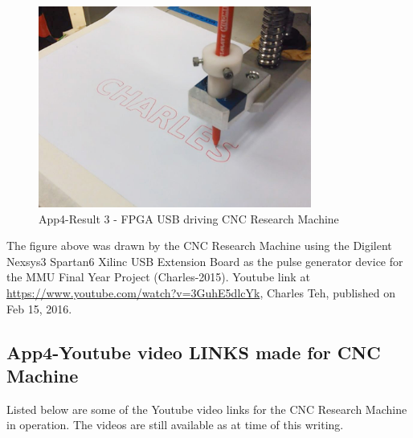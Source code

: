 \begin{figure}[htbp]
	\begin{center}
		\includegraphics[width=0.80\textwidth]{./07-images/img-Ch4App/cnc-drawing-result-CHARLES.jpg}
		\caption{App4-Result 3 - FPGA USB driving CNC Research Machine}
		\label{fig:App4-Charles - CNC Research Machine FPGA drawing CHARLES}
	\end{center}
\end{figure}
The figure above was drawn by the CNC Research Machine using the Digilent Nexsys3 Spartan6 Xilinc USB Extension Board as the pulse generator device for the MMU Final Year Project (Charles-2015). Youtube link at \url{https://www.youtube.com/watch?v=3GuhE5dlcYk}, Charles Teh, published on Feb 15, 2016. 

\subsection{App4-Youtube video LINKS made for CNC Machine}

Listed below are some of the Youtube video links for the CNC Research Machine in operation. The videos are still available as at time of this writing.

